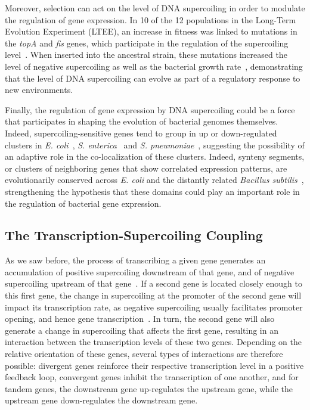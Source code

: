Moreover, selection can act on the level of DNA supercoiling in order to modulate the regulation of gene expression.
In 10 of the 12 populations in the Long-Term Evolution Experiment (LTEE), an increase in fitness was linked to mutations in the \emph{topA} and \emph{fis} genes, which participate in the regulation of the supercoiling level~\citep{crozat2010}.
When inserted into the ancestral strain, these mutations increased the level of negative supercoiling as well as the bacterial growth rate~\citep{crozat2005}, demonstrating that the level of DNA supercoiling can evolve as part of a regulatory response to new environments.

Finally, the regulation of gene expression by DNA supercoiling could be a force that participates in shaping the evolution of bacterial genomes themselves.
Indeed, supercoiling-sensitive genes tend to group in up or down-regulated clusters in \emph{E. coli}~\citep{peter2004}, \emph{S. enterica}~\citep{webber2013} and \emph{S. pneumoniae}~\citep{ferrandiz2010}, suggesting the possibility of an adaptive role in the co-localization of these clusters.
Indeed, synteny segments, or clusters of neighboring genes that show correlated expression patterns, are evolutionarily conserved across \emph{E. coli} and the distantly related \emph{Bacillus subtilis}~\citep{junier2016}, strengthening the hypothesis that these domains could play an important role in the regulation of bacterial gene expression.

\subsection{The Transcription-Supercoiling Coupling}

As we saw before, the process of transcribing a given gene generates an accumulation of positive supercoiling downstream of that gene, and of negative supercoiling upstream of that gene~\citep{liu1987}.
If a second gene is located closely enough to this first gene, the change in supercoiling at the promoter of the second gene will impact its transcription rate, as negative supercoiling usually facilitates promoter opening, and hence gene transcription~\citep{forquet2021}.
In turn, the second gene will also generate a change in supercoiling that affects the first gene, resulting in an interaction between the transcription levels of these two genes.
Depending on the relative orientation of these genes, several types of interactions are therefore possible: divergent genes reinforce their respective transcription level in a positive feedback loop, convergent genes inhibit the transcription of one another, and for tandem genes, the downstream gene up-regulates the upstream gene, while the upstream gene down-regulates the downstream gene.

